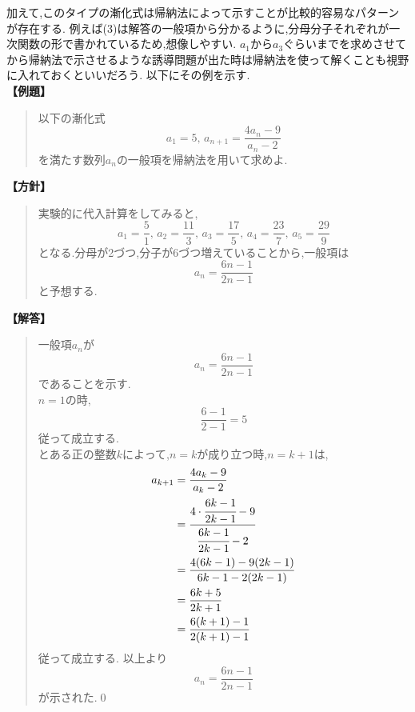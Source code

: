 加えて,このタイプの漸化式は帰納法によって示すことが比較的容易なパターンが存在する.
例えば(3)は解答の一般項から分かるように,分母分子それぞれが一次関数の形で書かれているため,想像しやすい.
$a_1$から$a_3$ぐらいまでを求めさせてから帰納法で示させるような誘導問題が出た時は帰納法を使って解くことも視野に入れておくといいだろう.
以下にその例を示す.\\
  \noindent\textbf{【例題】}
  \begin{quote}
    以下の漸化式
    \[
      a_1=5,\, a_{n+1}=\dfrac{4a_{n}-9}{a_{n}-2}
    \]
    を満たす数列$a_n$の一般項を帰納法を用いて求めよ.
  \end{quote}
  \textbf{【方針】}
  \begin{quote}
    実験的に代入計算をしてみると,
    \[
      a_1=\frac{5}{1},\,a_2=\frac{11}{3},\,a_3=\frac{17}{5},\,a_4=\frac{23}{7},\,a_5=\frac{29}{9}
    \]
    となる.分母が2づつ,分子が6づつ増えていることから,一般項は
    \[
      a_n=\frac{6n-1}{2n-1}
    \]
    と予想する.
  \end{quote}
  \textbf{【解答】}
  \begin{quote}
    一般項$a_n$が
    \[
      a_n=\frac{6n-1}{2n-1}
    \]
    であることを示す.\\
    $n=1$の時,
    \[
      \frac{6-1}{2-1}=5
    \]
    従って成立する.\\
    とある正の整数$k$によって,$n=k$が成り立つ時,$n=k+1$は,
      \begin{align*}
        a_{k+1}&=\frac{4a_{k}-9}{a_{k}-2}\\
        &=\cfrac{4\cdot \cfrac{6k-1}{2k-1}-9}{\cfrac{6k-1}{2k-1}-2}\\
        &=\frac{4(6k-1)-9(2k-1)}{6k-1-2(2k-1)}\\
        &=\frac{6k+5}{2k+1}\\
        &=\frac{6(k+1)-1}{2(k+1)-1}
    \end{align*}
    従って成立する.
    以上より
    \[
      a_n=\frac{6n-1}{2n-1}
    \]
    が示された.\qed
\end{quote}
